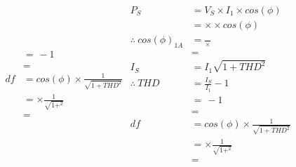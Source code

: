 \begin{equation*}
\begin{aligned}
	&= \frac{}{} - 1 \\
	&=  \\
	df      &= cos(\phi) \times \frac{1}{\sqrt{1+THD^{2}}} \\               
	&=  \times \frac{1}{\sqrt{1+^{2}}} \\
	&= \\
	\end{aligned}
	\begin{aligned}
	P_{S}   &= V_{S} \times I_{1} \times cos(\phi) \\
	&=  \times  \times cos(\phi) \\
	\therefore \
	cos(\phi)_{1A}  &= \frac{}{ \times } \\
	&=  \\
	I_{S}           &= I_{1} \sqrt{1+THD^{2}} \\
	\therefore \ 
	THD     &= \frac{I_{S}}{I_{1}} - 1\\    
	&= \frac{}{} - 1 \\
	&=  \\
	df      &= cos(\phi) \times \frac{1}{\sqrt{1+THD^{2}}} \\               
	&=  \times \frac{1}{\sqrt{1+^{2}}} \\
	&= \\
	\end{aligned}
	\end{equation*}
